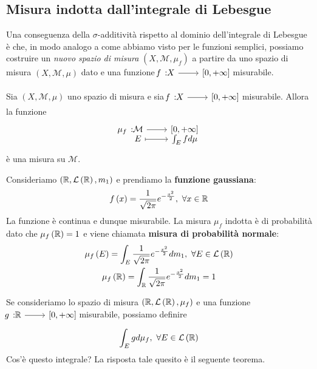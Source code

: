 \subsection{Misura indotta dall'integrale di Lebesgue}\label{misuraindotta}
Una conseguenza della $\sigma$-additività rispetto al dominio dell'integrale di Lebesgue è che, in modo analogo a come abbiamo visto per le funzioni semplici, possiamo costruire un \textit{nuovo spazio di misura} $\left(X,\mathcal{M},\mu_f\right)$ a partire da uno spazio di misura $\left(X,\mathcal{M},\mu\right)$ dato e una funzione $\funz{f}{X}{\left[0,+\infty\right]}$ misurabile.
\begin{corollaryqed}
Sia $\left(X,\mathcal{M},\mu\right)$ uno spazio di misura e sia $\funz{f}{X}{\left[0,+\infty\right]}$ misurabile. Allora la funzione
\begin{equation}
	\funztot{\mu_f}{\mathcal{M}}{\left[0,+\infty\right]}{E}{\int_Efd\mu}
\end{equation}
è una misura su $\mathcal{M}$.
\end{corollaryqed}
\begin{example}\label{gaussiana}
	Consideriamo $\left(\mathbb{R},\mathcal{L}\left(\mathbb{R}\right),m_1\right)$ e prendiamo la \textbf{funzione gaussiana}:
	\begin{equation*}
		f\left(x\right)=\frac{1}{\sqrt{2\pi}}e^{-\frac{x^2}{2}},\ \forall x\in\realset
	\end{equation*}
	La funzione è continua e dunque misurabile. La misura $\mu_f$ indotta è di probabilità dato che $\mu_f\left(\mathbb{R}\right)=1$ e viene chiamata \textbf{misura di probabilità normale}:
	\begin{gather*}
		\mu_f\left(E\right)=\int_E\frac{1}{\sqrt{2\pi}}e^{-\frac{x^2}{2}}dm_1,\ \forall E\in\mathcal{L}\left(\realset\right)\\
		\mu_f\left(\realset\right)=\int_{\realset}\frac{1}{\sqrt{2\pi}}e^{-\frac{x^2}{2}}dm_1=1
	\end{gather*}
\end{example}
Se consideriamo lo spazio di misura $\left(\mathbb{R},\mathcal{L}\left(\mathbb{R}\right),\mu_f\right)$ e una funzione $\funz{g}{\realset}{\left[0,+\infty\right]}$ misurabile, possiamo definire \begin{equation*}
	\int_Egd\mu_f,\ \forall E\in\mathcal{L}\left(\mathbb{R}\right)
\end{equation*}
Cos'è questo integrale? La risposta tale quesito è il seguente teorema.
